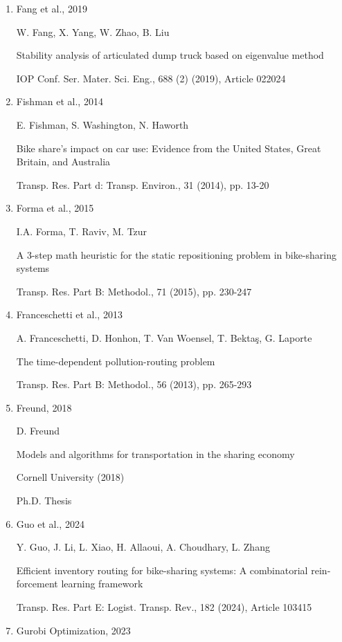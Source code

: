 \documentclass[
  english,
]{article}
\begin{document}
\begin{otherlanguage}{english}
\begin{enumerate}
  M. Du, L. Cheng, X. Li, F. Tang

  Static rebalancing optimization with considering the collection of malfunctioning bikes in
  free-floating bike sharing system

  Transp. Res. Part E: Logist. Transp. Rev., 141 (2020), Article 102012
\item
  Fang et al., 2019

  W. Fang, X. Yang, W. Zhao, B. Liu

  Stability analysis of articulated dump truck based on eigenvalue method

  IOP Conf. Ser. Mater. Sci. Eng., 688 (2) (2019), Article 022024
\item
  Fishman et al., 2014

  E. Fishman, S. Washington, N. Haworth

  Bike share's impact on car use: Evidence from the United States, Great Britain, and Australia

  Transp. Res. Part d: Transp. Environ., 31 (2014), pp. 13-20
\item
  Forma et al., 2015

  I.A. Forma, T. Raviv, M. Tzur

  A 3-step math heuristic for the static repositioning problem in bike-sharing systems

  Transp. Res. Part B: Methodol., 71 (2015), pp. 230-247
\item
  Franceschetti et al., 2013

  A. Franceschetti, D. Honhon, T. Van Woensel, T. Bektaş, G. Laporte

  The time-dependent pollution-routing problem

  Transp. Res. Part B: Methodol., 56 (2013), pp. 265-293
\item
  Freund, 2018

  D. Freund

  Models and algorithms for transportation in the sharing economy

  Cornell University (2018)

  Ph.D. Thesis
\item
  Guo et al., 2024

  Y. Guo, J. Li, L. Xiao, H. Allaoui, A. Choudhary, L. Zhang

  Efficient inventory routing for bike-sharing systems: A combinatorial reinforcement learning
  framework

  Transp. Res. Part E: Logist. Transp. Rev., 182 (2024), Article 103415
\item
  Gurobi Optimization, 2023


\end{enumerate}
\end{otherlanguage}
\end{document}
